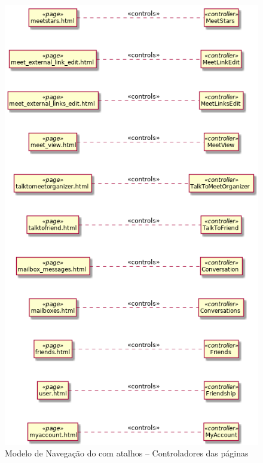 \begin{figure}[H]
	\centering
	\includegraphics[scale=0.5]{figuras/navigation-shortcut1_res1.png}
	\caption{Modelo de Navegação do \imprimirtitulo{} com atalhos -- Controladores das páginas}
	\label{fig:shortcut1:res1}
\end{figure}

